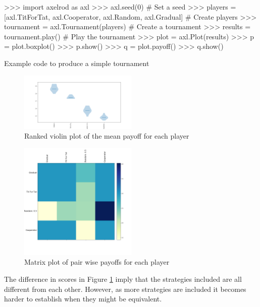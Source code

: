 \begin{listing}[htbp!]
    \begin{ExampleCode}
>>> import axelrod as axl
>>> axl.seed(0)  # Set a seed
>>> players = [axl.TitForTat, axl.Cooperator, axl.Random, axl.Gradual]  # Create players
>>> tournament = axl.Tournament(players)  # Create a tournament
>>> results = tournament.play()  # Play the tournament
>>> plot = axl.Plot(results)
>>> p = plot.boxplot()
>>> p.show()
>>> q = plot.payoff()
>>> q.show()
    \end{ExampleCode}
    \caption{Example code to produce a simple tournament}
    \label{lst:tournament}
\end{listing}

\begin{figure}[hbtp!]
    \centering
    \includegraphics[width=0.5\textwidth]{../img/examples/small_violin.png}
    \caption{Ranked violin plot of the mean payoff for each player}
    \label{fig:violinplot}
\end{figure}

\begin{figure}
    \centering
    \includegraphics[width=0.5\textwidth]{../img/examples/small_payoff.png}
    \caption{Matrix plot of pair wise payoffs for each player}
    \label{fig:matrixplot}
\end{figure}

The difference in scores in Figure \ref{fig:violinplot} imply that the strategies included are all different from each other.
However, as more strategies are included it becomes harder to establish when they might be equivalent.

